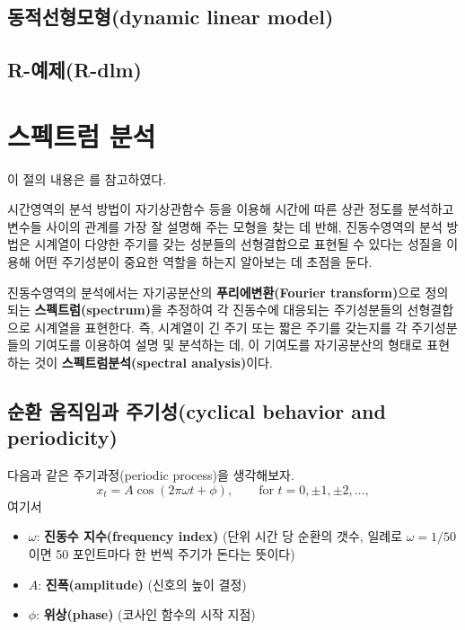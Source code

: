 \documentclass[b5paper,]{scrbook}
\theoremstyle{plain}
\theoremstyle{definition}
\numberwithin{equation}{section}
\begin{document}
\section{동적선형모형(dynamic linear model)}\label{dynamic-linear-model}

\section{R-예제(R-dlm)}\label{r-r-dlm}

\chapter{스펙트럼 분석}\label{spectral}

이 절의 내용은 \citep{Shumway2010}를 참고하였다.

시간영역의 분석 방법이 자기상관함수 등을 이용해 시간에 따른 상관 정도를
분석하고 변수들 사이의 관계를 가장 잘 설명해 주는 모형을 찾는 데 반해,
진동수영역의 분석 방법은 시계열이 다양한 주기를 갖는 성분들의
선형결합으로 표현될 수 있다는 성질을 이용해 어떤 주기성분이 중요한
역할을 하는지 알아보는 데 초점을 둔다.

진동수영역의 분석에서는 자기공분산의 \textbf{푸리에변환(Fourier
transform)}으로 정의되는 \textbf{스펙트럼(spectrum)}을 추정하여 각
진동수에 대응되는 주기성분들의 선형결합으로 시계열을 표현한다. 즉,
시계열이 긴 주기 또는 짧은 주기를 갖는지를 각 주기성분들의 기여도를
이용하여 설명 및 분석하는 데, 이 기여도를 자기공분산의 형태로 표현하는
것이 \textbf{스펙트럼분석(spectral analysis)}이다.

\section{순환 움직임과 주기성(cyclical behavior and
periodicity)}\label{--cyclical-behavior-and-periodicity}

다음과 같은 주기과정(periodic process)을 생각해보자.
\[x_{t}=A\cos(2\pi\omega t + \phi), \qquad{\text{for } t=0,\pm 1, \pm 2, \ldots,}\]
여기서

\begin{itemize}
\item
  \(\omega\): \textbf{진동수 지수(frequency index)} (단위 시간 당 순환의
  갯수, 일례로 \(\omega=1/50\)이면 50 포인트마다 한 번씩 주기가 돈다는
  뜻이다)
\item
  \(A\): \textbf{진폭(amplitude)} (신호의 높이 결정)
\item
  \(\phi\): \textbf{위상(phase)} (코사인 함수의 시작 지점)
\end{itemize}
\end{document}

